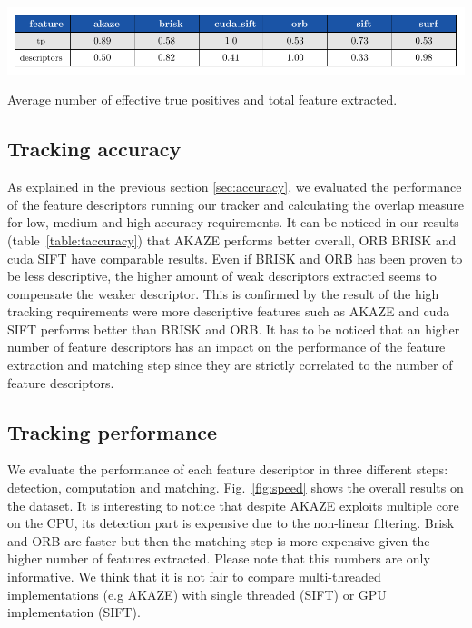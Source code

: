 \begin{table}[h]
\centerline{%
		\includegraphics[width=0.98\linewidth]{tables/descriptivness_ratio.pdf}}
    \vspace{-2mm} 
	\caption{Average number of effective true positives and total feature extracted.}
	\label{table:tp_ratio}
\end{table}

\subsection{Tracking accuracy}

As explained in the previous section \ref{sec:accuracy}, we evaluated the performance of the feature descriptors running our tracker and calculating the overlap measure for low, medium and high accuracy requirements. It can be noticed in our results (table~\ref{table:taccuracy}) that AKAZE performs better overall, ORB BRISK and cuda SIFT have comparable results. Even if BRISK and ORB has been proven to be less descriptive, the higher amount of weak descriptors extracted seems to compensate the weaker descriptor. This is confirmed by the result of the high tracking requirements were more descriptive features such as AKAZE and cuda SIFT performs better than BRISK and ORB. It has to be noticed that an higher number of feature descriptors has an impact on the performance of the feature extraction and matching step since they are strictly correlated to the number of feature descriptors. 

\subsection{Tracking performance}

We evaluate the performance of each feature descriptor in three different steps: detection, computation and matching. Fig.~\ref{fig:speed} shows the overall results on the dataset. It is interesting to notice that despite AKAZE exploits multiple core on the CPU, its detection part is expensive due to the non-linear filtering. Brisk and ORB are faster but then the matching step is more expensive given the higher number of features extracted. Please note that this numbers are only informative. We think that it is not fair to compare multi-threaded implementations (e.g AKAZE) with single threaded (SIFT) or GPU implementation (SIFT).

